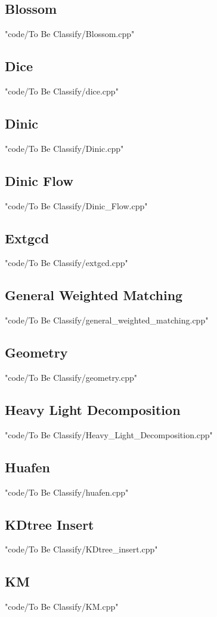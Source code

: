 \documentclass [landscape,8pt,a4paper,twocolumn]{article}
\begin{document}
\subsection{Blossom}
 {"code/To Be Classify/Blossom.cpp"}
\subsection{Dice}
 {"code/To Be Classify/dice.cpp"}
\subsection{Dinic}
 {"code/To Be Classify/Dinic.cpp"}
\subsection{Dinic Flow}
 {"code/To Be Classify/Dinic_Flow.cpp"}
\subsection{Extgcd}
 {"code/To Be Classify/extgcd.cpp"}
\subsection{General Weighted Matching}
 {"code/To Be Classify/general_weighted_matching.cpp"}
\subsection{Geometry}
 {"code/To Be Classify/geometry.cpp"}
\subsection{Heavy Light Decomposition}
 {"code/To Be Classify/Heavy_Light_Decomposition.cpp"}
\subsection{Huafen}
 {"code/To Be Classify/huafen.cpp"}
\subsection{KDtree Insert}
 {"code/To Be Classify/KDtree_insert.cpp"}
\subsection{KM}
 {"code/To Be Classify/KM.cpp"}
\end{document}
